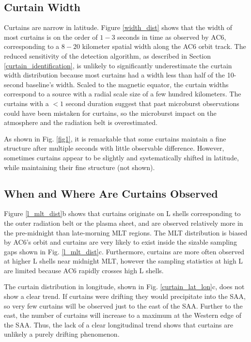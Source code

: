 \documentclass[draft]{agujournal2019}
\begin{document}
\subsection{Curtain Width}
Curtains are narrow in latitude. Figure \ref{width_dist} shows that the width of most curtains is on the order of $1-3$ seconds in time as observed by AC6, corresponding to a $8-20$ kilometer spatial width along the AC6 orbit track. The reduced sensitivity of the detection algorithm, as described in Section \ref{curtain_identification}, is unlikely to significantly underestimate the curtain width distribution because most curtains had a width less than half of the 10-second baseline's width. Scaled to the magnetic equator, the curtain widths correspond to a source with a radial scale size of a few hundred kilometers. The curtains with a $< 1$ second duration suggest that past microburst observations could have been mistaken for curtains, so the microburst impact on the atmosphere and the radiation belt is overestimated.

As shown in Fig. \ref{fig1}, it is remarkable that some curtains maintain a fine structure after multiple seconds with little observable difference. However, sometimes curtains appear to be slightly and systematically shifted in latitude, while maintaining their fine structure (not shown).

\subsection{When and Where Are Curtains Observed}
Figure \ref{l_mlt_dist}b shows that curtains originate on L shells corresponding to the outer radiation belt or the plasma sheet, and are observed relatively more in the pre-midnight than late-morning MLT regions. The MLT distribution is biased by AC6's orbit and curtains are very likely to exist inside the sizable sampling gaps shown in Fig. \ref{l_mlt_dist}c. Furthermore, curtains are more often observed at higher L shells near midnight MLT, however the sampling statistics at high L are limited because AC6 rapidly crosses high L shells. 

The curtain distribution in longitude, shown in Fig. \ref{curtain_lat_lon}c, does not show a clear trend. If curtains were drifting they would precipitate into the SAA, so very few curtains will be observed just to the east of the SAA. Further to the east, the number of curtains will increase to a maximum at the Western edge of the SAA. Thus, the lack of a clear longitudinal trend shows that curtains are unlikely a purely drifting phenomenon.
\end{document}
